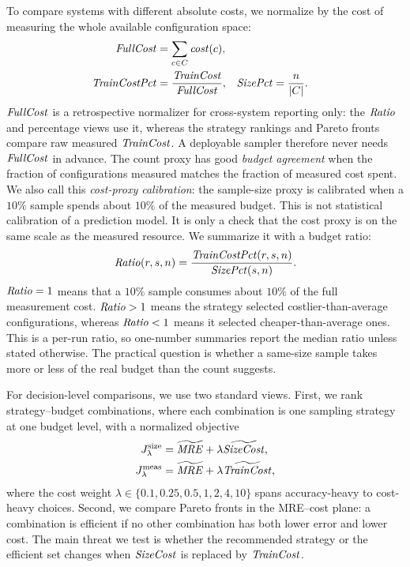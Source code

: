 To compare systems with different absolute costs, we normalize by the cost of
measuring the whole available configuration space:
\begin{align}
\mathit{FullCost} &= \sum_{c\in C}\mathit{cost}(c),\\
\mathit{TrainCostPct} &= \frac{\mathit{TrainCost}}{\mathit{FullCost}},&
\mathit{SizePct} &= \frac{n}{|C|}.
\label{eq:pct}
\end{align}
$\mathit{FullCost}$ is a retrospective normalizer for cross-system reporting only: the
$\mathit{Ratio}$ and percentage views use it, whereas the strategy rankings and Pareto
fronts compare raw measured $\mathit{TrainCost}$. A deployable sampler therefore never
needs $\mathit{FullCost}$ in advance.
The count proxy has good \emph{budget agreement} when the fraction of
configurations measured matches the fraction of measured cost spent. We also
call this \emph{cost-proxy calibration}: the sample-size proxy is calibrated
when a $10\%$ sample spends about $10\%$ of the measured budget. This is not
statistical calibration of a prediction model. It is only a check that the cost
proxy is on the same scale as the measured resource. We summarize it with a
budget ratio:
\begin{equation}
\mathit{Ratio}(r,s,n)=
\frac{\mathit{TrainCostPct}(r,s,n)}{\mathit{SizePct}(s,n)}.
\label{eq:ratio}
\end{equation}
$\mathit{Ratio}=1$ means that a $10\%$ sample consumes about $10\%$ of the full
measurement cost. $\mathit{Ratio}>1$ means the strategy selected costlier-than-average
configurations, whereas $\mathit{Ratio}<1$ means it selected cheaper-than-average ones. This is
a per-run ratio, so one-number summaries report the median ratio unless stated
otherwise. The practical question is whether a same-size sample takes more or
less of the real budget than the count suggests.

For decision-level comparisons, we use two standard views. First, we rank
strategy--budget combinations, where each combination is one sampling strategy
at one budget level, with a normalized objective
\begin{align}
J^{\text{size}}_{\lambda} &= \widetilde{\mathit{MRE}}+\lambda\widetilde{\mathit{SizeCost}},\\
J^{\text{meas}}_{\lambda} &= \widetilde{\mathit{MRE}}+\lambda\widetilde{\mathit{TrainCost}},
\end{align}
where the cost weight $\lambda\in\{0.1,0.25,0.5,1,2,4,10\}$ spans
accuracy-heavy to cost-heavy choices. Second, we compare Pareto fronts in the
MRE--cost plane: a combination is efficient if no other combination has both
lower error and lower cost. The main threat we test is whether the recommended
strategy or the efficient set changes when $\mathit{SizeCost}$ is replaced by
$\mathit{TrainCost}$.

